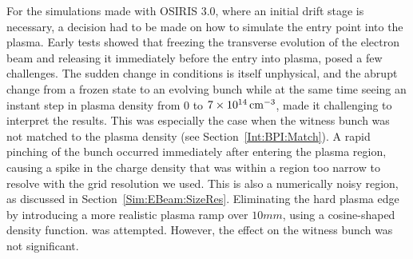 For the simulations made with OSIRIS 3.0, where an initial drift stage is necessary, a decision had to be made on how to simulate the entry point into the plasma.
Early tests showed that freezing the transverse evolution of the electron beam and releasing it immediately before the entry into plasma, posed a few challenges.
The sudden change in conditions is itself unphysical, and the abrupt change from a frozen state to an evolving bunch while at the same time seeing an instant step in plasma density from $0$ to $7\times 10^{14}\,\mathrm{cm}^{-3}$, made it challenging to interpret the results.
This was especially the case when the witness bunch was not matched to the plasma density (see Section~\ref{Int:BPI:Match}).
A rapid pinching of the bunch occurred immediately after entering the plasma region, causing a spike in the charge density that was within a region too narrow to resolve with the grid resolution we used.
This is also a numerically noisy region, as discussed in Section~\ref{Sim:EBeam:SizeRes}.
Eliminating the hard plasma edge by introducing a more realistic plasma ramp over $10\unit{mm}$, using a cosine-shaped density function. was attempted.
However, the effect on the witness bunch was not significant.


